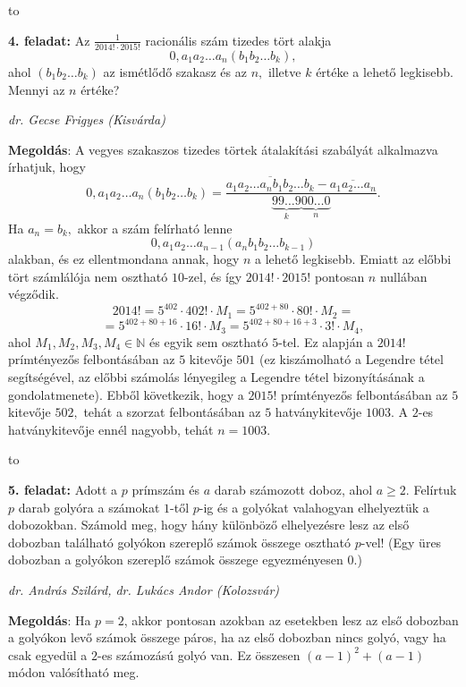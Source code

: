 \documentclass[a4paper,10pt]{article}
\newcommand{\ki}[2]{\hfill {\it #1 (#2)}\medskip}
\newcommand{\vonal}{\hbox to \hsize{\hskip2truecm\hrulefill\hskip2truecm}}
\begin{document}
\medskip

\vonal

{\bf 4. feladat: } Az $\displaystyle\frac{1}{2014!\cdot 2015!}$ racionális szám
tizedes tört alakja $$0,a_1a_2\ldots a_n(b_1b_2\ldots b_k),$$ ahol
$(b_1b_2\ldots b_k)$ az ismétlődő szakasz és az $n,$
illetve $k$ értéke a lehető legkisebb. Mennyi az $n$
értéke?

\ki{dr. Gecse Frigyes}{Kisvárda}\medskip

{\bf Megoldás}: A vegyes szakaszos tizedes törtek átalakítási szabályát alkalmazva írhatjuk, hogy
$$0,a_1a_2\ldots a_n(b_1b_2\ldots b_k)=\frac{\overline{a_1a_2\ldots a_nb_1b_2\ldots b_k}-\overline{a_1a_2\ldots a_n}}{\underbrace{99\ldots 9}_k\underbrace{00\ldots 0}_{n}}.$$
Ha $a_n=b_k,$ akkor a szám felírható lenne $$0,a_1a_2\ldots
a_{n-1}(a_nb_1b_2\ldots b_{k-1})$$ alakban, és ez ellentmondana
annak, hogy $n$ a lehető legkisebb. Emiatt az előbbi tört
számlálója nem osztható $10$-zel, és így
$2014!\cdot 2015!$ pontosan $n$ nullában végződik.
$$2014!=5^{402}\cdot 402! \cdot M_1=5^{402+80}\cdot 80!\cdot M_2=$$ $$=5^{402+80+16}\cdot 16! \cdot M_3=
5^{402+80+16+3}\cdot 3!\cdot M_4,$$ ahol $M_1,M_2,M_3,M_4\in
\mathbb{N}$ és egyik sem osztható $5$-tel. Ez alapján a
$2014!$ prímtényezős felbontásában az $5$ kitevője
$501$ (ez kiszámolható a Legendre tétel segítségével, az
előbbi számolás lényegileg a Legendre tétel
bizonyításának a gondolatmenete). Ebből kö\-vet\-ke\-zik,
hogy a $2015!$ prímtényezős felbontásában az $5$ kitev\H
oje $502,$ tehát a szorzat felbontásában az $5$
hatványkitevője $1003.$ A $2$-es hatványkitevője ennél
nagyobb, tehát $n=1003.$

\medskip

\vonal

{\bf 5. feladat: } Adott a $p$ prímszám és $a$ darab számozott doboz, ahol
$a\ge 2.$ Felírtuk $p$ darab golyóra a számokat $1$-től
$p$-ig és a golyókat valahogyan elhelyeztük a dobozokban.
Számold meg, hogy hány különböző elhelyezésre lesz az
első dobozban található golyókon szereplő számok
összege osztható $p$-vel! (Egy üres dobozban a golyókon
szereplő számok összege egyezményesen $0.$)


\ki{dr. András Szilárd, dr. Lukács Andor}{Kolozsvár}\medskip

{\bf Megoldás}: Ha $p=2$, akkor pontosan azokban az esetekben lesz az első
dobozban a golyókon levő számok összege páros, ha az
első dobozban nincs golyó, vagy ha csak egyed\" ul a $2$-es
számozású golyó van. Ez összesen $(a-1)^2 + (a-1)$ módon
valósítható meg.
\end{document}
